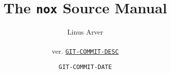 \documentclass[letterpaper,twoside,12pt]{article}
\begin{document}
\title{The \texttt{nox} Source Manual}
\author{Linus Arver\\
\\
ver. \href{http://www.github.com/listx/nox/commit/GIT-COMMIT-HASH}{\texttt{GIT-COMMIT-DESC}}
}
\date{\texttt{GIT-COMMIT-DATE}}
\maketitle
\tableofcontents








\end{document}
